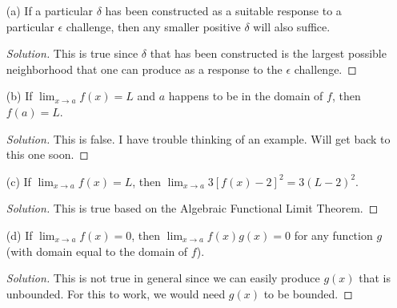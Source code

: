 \begin{enumerate}
    \item[(a)] If a particular \( \delta \) has been constructed as a suitable response to a particular \( \epsilon  \) challenge, then any smaller positive \( \delta \) will also suffice.
        \begin{proof}[Solution]
        This is true since \( \delta \) that has been constructed is the largest possible neighborhood that one can produce as a response to the \( \epsilon  \) challenge. 
        \end{proof}
    \item[(b)] If \( \lim_{ x \to a } f(x) = L  \) and \( a \) happens to be in the domain of \( f \), then \( f(a) = L  \).
        \begin{proof}[Solution]
        This is false. I have trouble thinking of an example. Will get back to this one soon. 
        \end{proof}
    \item[(c)] If \( \lim_{ x \to a } f(x) = L  \), then \( \lim_{ x \to a } 3[f(x) - 2 ]^2 = 3(L-2)^2 \).
        \begin{proof}[Solution]
        This is true based on the Algebraic Functional Limit Theorem.
        \end{proof}
    \item[(d)] If \( \lim_{ x \to a } f(x) = 0  \), then \( \lim_{ x\to a } f(x)g(x) = 0   \) for any function \( g \) (with domain equal to the domain of \( f \)).
        \begin{proof}[Solution]
        This is not true in general since we can easily produce \( g(x)  \) that is unbounded. For this to work, we would need \( g(x) \) to be bounded.
        \end{proof}
\end{enumerate}

